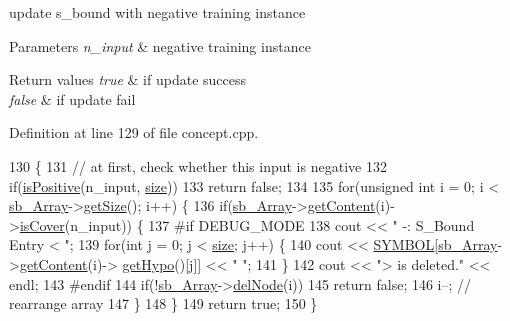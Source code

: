 update s\-\_\-bound with negative training instance 


\begin{DoxyParams}{Parameters}
{\em n\-\_\-input} & negative training instance \\
\hline
\end{DoxyParams}

\begin{DoxyRetVals}{Return values}
{\em true} & if update success \\
\hline
{\em false} & if update fail \\
\hline
\end{DoxyRetVals}


Definition at line 129 of file concept.\-cpp.


\begin{DoxyCode}
130 \{
131   \textcolor{comment}{// at first, check whether this input is negative}
132   \textcolor{keywordflow}{if}(\hyperlink{concept_8cpp_a3334c3b48c5ef4c8a07f5d45f5df5087}{isPositive}(n\_input, \hyperlink{class_s___bound_a9742961078971270b164bb793b64ee06}{size}))
133       \textcolor{keywordflow}{return} \textcolor{keyword}{false};
134 
135   \textcolor{keywordflow}{for}(\textcolor{keywordtype}{unsigned} \textcolor{keywordtype}{int} i = 0; i < \hyperlink{class_s___bound_a2fa303e4f1e4c2df793e1474f0aa6481}{sb\_Array}->\hyperlink{class_list_a4d8d3acaf718d470e1084814a6155814}{getSize}(); i++) \{
136       \textcolor{keywordflow}{if}(\hyperlink{class_s___bound_a2fa303e4f1e4c2df793e1474f0aa6481}{sb\_Array}->\hyperlink{class_list_aa93404b4c7f3f86a560a0a675f55c9bd}{getContent}(i)->\hyperlink{class_hypothesis_a38c5f393775c1dd9eada90c7e5f163e0}{isCover}(n\_input)) \{
137 \textcolor{preprocessor}{#if DEBUG\_MODE}
138 \textcolor{preprocessor}{}        cout << \textcolor{stringliteral}{" -: S\_Bound Entry < "};
139         \textcolor{keywordflow}{for}(\textcolor{keywordtype}{int} j = 0; j < \hyperlink{class_s___bound_a9742961078971270b164bb793b64ee06}{size}; j++) \{
140             cout << \hyperlink{concept_8cpp_a6a0fcd5aed2dc21ce5f79cbe7c3a8e2f}{SYMBOL}[\hyperlink{class_s___bound_a2fa303e4f1e4c2df793e1474f0aa6481}{sb\_Array}->\hyperlink{class_list_aa93404b4c7f3f86a560a0a675f55c9bd}{getContent}(i)->
      \hyperlink{class_hypothesis_a601cd415f0c319f3be507951336d3bda}{getHypo}()[j]] << \textcolor{stringliteral}{" "};
141         \}
142         cout << \textcolor{stringliteral}{"> is deleted."} << endl;
143 \textcolor{preprocessor}{#endif}
144 \textcolor{preprocessor}{}        \textcolor{keywordflow}{if}(!\hyperlink{class_s___bound_a2fa303e4f1e4c2df793e1474f0aa6481}{sb\_Array}->\hyperlink{class_list_af4e9e7db2b56cd948ec225445f3250da}{delNode}(i))
145         \textcolor{keywordflow}{return} \textcolor{keyword}{false};
146       i--; \textcolor{comment}{// rearrange array}
147       \}
148   \}
149   \textcolor{keywordflow}{return} \textcolor{keyword}{true};
150 \}
\end{DoxyCode}
